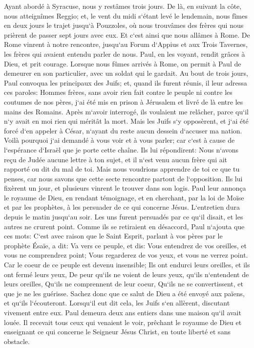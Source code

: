 \verse Ayant abordé à Syracuse, nous y restâmes trois jours. 
\verse De là, en suivant la côte, nous atteignîmes Reggio; et, le vent du midi s`étant levé le lendemain, nous fîmes en deux jours le trajet jusqu`à Pouzzoles, 
\verse où nous trouvâmes des frères qui nous prièrent de passer sept jours avec eux. Et c`est ainsi que nous allâmes à Rome. 
\verse De Rome vinrent à notre rencontre, jusqu`au Forum d`Appius et aux Trois Tavernes, les frères qui avaient entendu parler de nous. Paul, en les voyant, rendit grâces à Dieu, et prit courage. 
\verse Lorsque nous fûmes arrivés à Rome, on permit à Paul de demeurer en son particulier, avec un soldat qui le gardait. 
\verse Au bout de trois jours, Paul convoqua les principaux des Juifs; et, quand ils furent réunis, il leur adressa ces paroles: Hommes frères, sans avoir rien fait contre le peuple ni contre les coutumes de nos pères, j`ai été mis en prison à Jérusalem et livré de là entre les mains des Romains. 
\verse Après m`avoir interrogé, ils voulaient me relâcher, parce qu`il n`y avait en moi rien qui méritât la mort. 
\verse Mais les Juifs s`y opposèrent, et j`ai été forcé d`en appeler à César, n`ayant du reste aucun dessein d`accuser ma nation. 
\verse Voilà pourquoi j`ai demandé à vous voir et à vous parler; car c`est à cause de l`espérance d`Israël que je porte cette chaîne. 
\verse Ils lui répondirent: Nous n`avons reçu de Judée aucune lettre à ton sujet, et il n`est venu aucun frère qui ait rapporté ou dit du mal de toi. 
\verse Mais nous voudrions apprendre de toi ce que tu penses, car nous savons que cette secte rencontre partout de l`opposition. 
\verse Ils lui fixèrent un jour, et plusieurs vinrent le trouver dans son logis. Paul leur annonça le royaume de Dieu, en rendant témoignage, et en cherchant, par la loi de Moïse et par les prophètes, à les persuader de ce qui concerne Jésus. L`entretien dura depuis le matin jusqu`au soir. 
\verse Les uns furent persuadés par ce qu`il disait, et les autres ne crurent point. 
\verse Comme ils se retiraient en désaccord, Paul n`ajouta que ces mots: C`est avec raison que le Saint Esprit, parlant à vos pères par le prophète Ésaïe, a dit: 
\verse Va vers ce peuple, et dis: Vous entendrez de vos oreilles, et vous ne comprendrez point; Vous regarderez de vos yeux, et vous ne verrez point. 
\verse Car le coeur de ce peuple est devenu insensible; Ils ont endurci leurs oreilles, et ils ont fermé leurs yeux, De peur qu`ils ne voient de leurs yeux, qu`ils n`entendent de leurs oreilles, Qu`ils ne comprennent de leur coeur, Qu`ils ne se convertissent, et que je ne les guérisse. 
\verse Sachez donc que ce salut de Dieu a été envoyé aux païens, et qu`ils l`écouteront. 
\verse Lorsqu`il eut dit cela, les Juifs s`en allèrent, discutant vivement entre eux. 
\verse Paul demeura deux ans entiers dans une maison qu`il avait louée. Il recevait tous ceux qui venaient le voir, 
\verse prêchant le royaume de Dieu et enseignant ce qui concerne le Seigneur Jésus Christ, en toute liberté et sans obstacle. 
